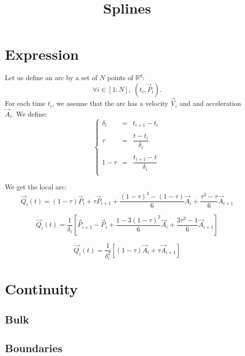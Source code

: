 \documentclass[aps,onecolumn]{revtex4}
\begin{document}
\title{Splines}
\maketitle

\section{Expression}

Let us define an arc by a set of $N$ points of $\mathbb{R}^d$:
\begin{equation}
	\forall i \in [1:N],\;	(t_i,\vec{P}_i).
\end{equation}
For each time $t_i$, we assume that the arc has a velocity $\vec{V}_i$ and and acceleration $\vec{A}_i$.
We define:
\begin{equation}
\left\lbrace
\begin{array}{rcl}
	\delta_i & = & t_{i+1}-t_{i}\\
	\\
	\tau     & = & \dfrac{t-t_{i}}{\delta_i}\\
	\\
	1-\tau   & = & \dfrac{t_{i+1}-t}{\delta_i}\\
\end{array}
\right.
\end{equation}
		
We get the local arc:
\begin{equation}
	\vec{Q}_i(t) = (1-\tau) \vec{P}_i + \tau \vec{P}_{i+1} + \dfrac{ (1-\tau)^3 - (1-\tau) }{6} \vec{A}_{i} + \dfrac{\tau^3-\tau}{6} \vec{A}_{i+1}
\end{equation}	

\begin{equation}
	\dot{\vec{Q}}_i(t) = \dfrac{1}{\delta_i} \left[ \vec{P}_{i+1} - \vec{P}_i + \dfrac{1-3(1-\tau)^2}{6}\vec{A}_i + \dfrac{3\tau^2-1}{6} \vec{A}_{i+1}\right]
\end{equation}

\begin{equation}
	\ddot{\vec{Q}}_i(t) = \dfrac{1}{\delta_i^2} \left[ (1-\tau) \vec{A}_i + \tau \vec{A}_{i+1} \right]
\end{equation}

\section{Continuity}

\subsection{Bulk}


\subsection{Boundaries}
\end{document}
